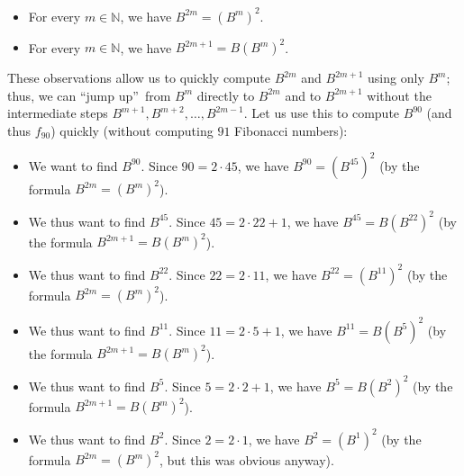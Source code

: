\documentclass[numbers=enddot,12pt,final,onecolumn,notitlepage]{scrartcl}%
\theoremstyle{definition}
\begin{document}
\begin{itemize}
\item For every $m\in\mathbb{N}$, we have $B^{2m}=\left(  B^{m}\right)  ^{2}$.

\item For every $m\in\mathbb{N}$, we have $B^{2m+1}=B\left(  B^{m}\right)
^{2}$.
\end{itemize}

These observations allow us to quickly compute $B^{2m}$ and $B^{2m+1}$ using
only $B^{m}$; thus, we can \textquotedblleft jump up\textquotedblright\ from
$B^{m}$ directly to $B^{2m}$ and to $B^{2m+1}$ without the intermediate steps
$B^{m+1},B^{m+2},\ldots,B^{2m-1}$. Let us use this to compute $B^{90}$ (and
thus $f_{90}$) quickly (without computing $91$ Fibonacci numbers):

\begin{itemize}
\item We want to find $B^{90}$. Since $90=2\cdot45$, we have $B^{90}=\left(
B^{45}\right)  ^{2}$ (by the formula $B^{2m}=\left(  B^{m}\right)  ^{2}$).

\item We thus want to find $B^{45}$. Since $45=2\cdot22+1$, we have
$B^{45}=B\left(  B^{22}\right)  ^{2}$ (by the formula $B^{2m+1}=B\left(
B^{m}\right)  ^{2}$).

\item We thus want to find $B^{22}$. Since $22=2\cdot11$, we have
$B^{22}=\left(  B^{11}\right)  ^{2}$ (by the formula $B^{2m}=\left(
B^{m}\right)  ^{2}$).

\item We thus want to find $B^{11}$. Since $11=2\cdot5+1$, we have
$B^{11}=B\left(  B^{5}\right)  ^{2}$ (by the formula $B^{2m+1}=B\left(
B^{m}\right)  ^{2}$).

\item We thus want to find $B^{5}$. Since $5=2\cdot2+1$, we have
$B^{5}=B\left(  B^{2}\right)  ^{2}$ (by the formula $B^{2m+1}=B\left(
B^{m}\right)  ^{2}$).

\item We thus want to find $B^{2}$. Since $2=2\cdot1$, we have $B^{2}=\left(
B^{1}\right)  ^{2}$ (by the formula $B^{2m}=\left(  B^{m}\right)  ^{2}$, but
this was obvious anyway).
\end{itemize}
\end{document}

